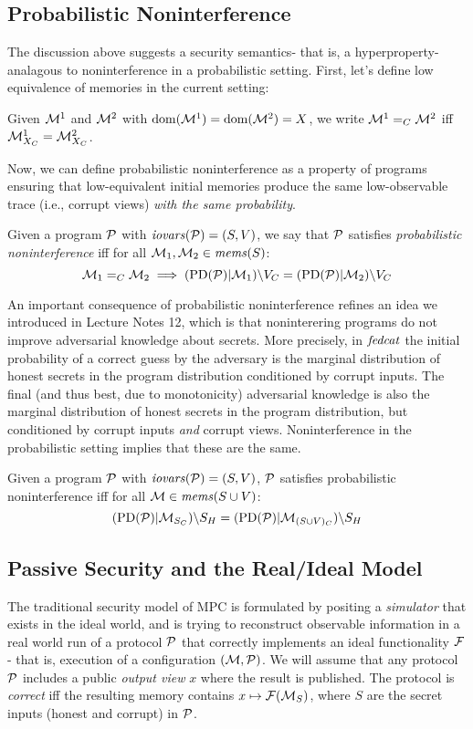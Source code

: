 \subsection{Probabilistic Noninterference} The discussion above suggests a
security semantics- that is, a hyperproperty- analagous to
noninterference in a probabilistic setting. First, let's
define low equivalence of memories in the current setting:
\begin{definition}
  Given $\mathcal{M}^1$ and $\mathcal{M}^2$ with $\mathrm{dom}(\mathcal{M}^1) = \mathrm{dom}(\mathcal{M}^2) = X$,
  we write $\mathcal{M}^1 =_C \mathcal{M}^2$ iff $\mathcal{M}^1_{X_C} = \mathcal{M}^2_{X_C}$.
\end{definition}
Now, we can define probabilistic noninterference as a property of
programs ensuring that low-equivalent initial memories produce
the same low-observable trace (i.e., corrupt views) \emph{with the
same probability}. 
\begin{definition}
  Given a program $\mathcal{P}$ with $\mathit{iovars}(\mathcal{P}) = (S,V)$, we say that
  $\mathcal{P}$ satisfies \emph{probabilistic noninterference} iff for all
  $\mathcal{M}_1, \mathcal{M}_2 \in \mathit{mems}(S)$:
  $$\mathcal{M}_1 =_C \mathcal{M}_2 \implies
    (\mathrm{PD}(\mathcal{P})|\mathcal{M}_1)\backslash V_C =
    (\mathrm{PD}(\mathcal{P})|\mathcal{M}_2)\backslash V_C$$
\end{definition}

An important consequence of probabilistic noninterference refines an
idea we introduced in Lecture Notes 12, which is that noninterering
programs do not improve adversarial knowledge about secrets.
More precisely, in $\mathit{fedcat}$ the initial probability of a correct
guess by the adversary is the marginal distribution of honest secrets
in the program distribution conditioned by corrupt inputs.
The final (and thus best, due to monotonicity) adversarial
knowledge is also the marginal distribution of honest secrets in the
program distribution, but conditioned by corrupt inputs \emph{and}
corrupt views. Noninterference in the probabilistic setting implies
that these are the same.
\begin{lemma}
  Given a program $\mathcal{P}$ with $\mathit{iovars}(\mathcal{P}) = (S,V)$, 
  $\mathcal{P}$ satisfies probabilistic noninterference iff for all
  $\mathcal{M} \in \mathit{mems}(S \cup V)$:
  $$(\mathrm{PD}(\mathcal{P})|\mathcal{M}_{S_C})\backslash S_H =
    (\mathrm{PD}(\mathcal{P})|\mathcal{M}_{(S\cup V)_C})\backslash S_H $$
\end{lemma}

\subsection{Passive Security and the Real/Ideal Model} The traditional
security model of MPC is formulated by positing a \emph{simulator} that
exists in the ideal world, and is trying to reconstruct observable
information in a real world run of a protocol $\mathcal{P}$ that
correctly implements an ideal functionality $\mathcal{F}$- that is,
execution of a configuration $(\mathcal{M},\mathcal{P})$. We will assume
that any protocol $\mathcal{P}$ includes a public \emph{output view}
$x$ where the result is published. The protocol is
\emph{correct} iff the resulting memory contains $x \mapsto
\mathcal{F}(\mathcal{M}_S)$, where $S$ are the secret inputs (honest
and corrupt) in $\mathcal{P}$.

